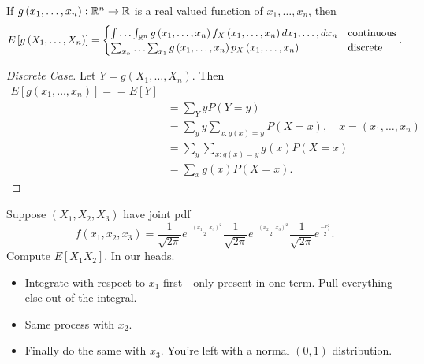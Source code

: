 \begin{theorem}
	If $g\left( x_{1} , \ldots , x_{n} \right) : \mathbb{R}^{n} \to \mathbb{R}$ is a real valued function of $x_{1} , \ldots , x_{n}$, then
	\begin{align*}
		E\left[ g\left( X_{1} , \ldots , X_{n} \right)  \right] = \begin{cases}
			\int \ldots \int_{\mathbb{R}^{n}} g\left( x_{1} , \ldots , x_{n} \right)  f_{X}\left( x_{1} , \ldots , x_{n} \right) dx_{1} , \ldots , dx_{n} & \text{continuous} \\
			\sum_{x_{n}}^{ }  \ldots \sum_{x_1}^{ } g\left( x_{1} , \ldots , x_{n} \right) p_{X}\left( x_{1} , \ldots , x_{n} \right)  & \text{discrete}
		\end{cases}
	.\end{align*}
	\begin{proof}[Discrete Case]
		Let $Y = g\left( X_{1} , \ldots , X_{n} \right) $. Then 
		\begin{align*}
			E\left[ g\left( x_{1} , \ldots , x_{n} \right)  \right]  == E\left[ Y \right] \\
			&= \sum_{Y} y P\left( Y = y \right)  \\
			&= \sum_{y}^{ } y \sum_{x:g\left( x \right)  = y} P\left( X = x \right) , \quad x = ( x_{1} , \ldots , x_{n}) \\
			&= \sum_{y}^{ } \sum_{x: g\left( x \right) = y} g\left( x \right) P\left( X = x \right)  \\
			&=\sum_{x} g\left( x \right) P\left( X = x \right)
		.\end{align*}
	\end{proof}
\end{theorem}

\begin{example}
	Suppose $\left( X_1, X_2 ,X_3  \right) $ have joint pdf 
	\[
		f\left( x_1, x_2, x_3 \right) = \frac{1}{\sqrt{2 \pi} }e^{\frac{-\left( x_1 - x_3 \right) ^2}{2 }} \frac{1}{\sqrt{2 \pi} }e^{\frac{-\left( x_2 - x_3 \right) ^2}{2 }}  \frac{1}{\sqrt{2 \pi} }e^{\frac{- x_3  ^2}{2 }} 
	.\] 
	Compute $E\left[ X_1 X_2 \right] $. In our heads. 
	\begin{itemize}
		\item Integrate with respect to $x_1$ first - only present in one term. Pull everything else out of the integral.
		\item Same process with $x_2$. 
		\item Finally do the same with $x_{3}$. You're left with a normal $(0, 1)$ distribution. 
	\end{itemize}
\end{example}
